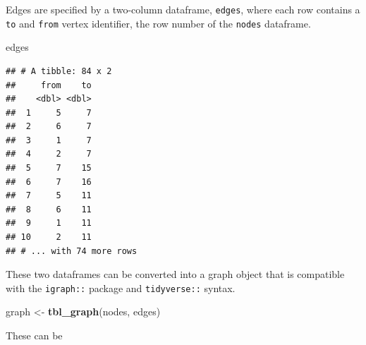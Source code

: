 \documentclass[
]{article}
\newenvironment{Shaded}{\begin{snugshade}}{\end{snugshade}}
\newcommand{\KeywordTok}[1]{\textcolor[rgb]{0.13,0.29,0.53}{\textbf{#1}}}
\newcommand{\NormalTok}[1]{#1}
\newcommand{\StringTok}[1]{\textcolor[rgb]{0.31,0.60,0.02}{#1}}
\begin{document}
Edges are specified by a two-column dataframe, \texttt{edges}, where each row contains a \texttt{to} and \texttt{from} vertex identifier, the row number of the \texttt{nodes} dataframe.

\begin{Shaded}
\begin{Highlighting}[]
\NormalTok{edges}
\end{Highlighting}
\end{Shaded}

\begin{verbatim}
## # A tibble: 84 x 2
##     from    to
##    <dbl> <dbl>
##  1     5     7
##  2     6     7
##  3     1     7
##  4     2     7
##  5     7    15
##  6     7    16
##  7     5    11
##  8     6    11
##  9     1    11
## 10     2    11
## # ... with 74 more rows
\end{verbatim}

These two dataframes can be converted into a graph object that is compatible with the \texttt{igraph::} package and \texttt{tidyverse::} syntax.

\begin{Shaded}
\begin{Highlighting}[]
\NormalTok{graph <{-}}\StringTok{ }\KeywordTok{tbl\_graph}\NormalTok{(nodes, edges)}
\end{Highlighting}
\end{Shaded}

These can be
\end{document}
